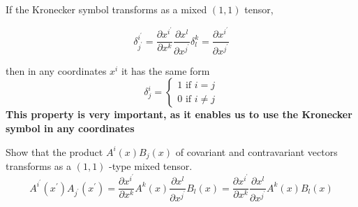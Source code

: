 If the Kronecker symbol transforms as a mixed $(1,1)$ tensor,
\begin{qt}
\begin{equation}
\delta_{j^{\prime}}^{i^{\prime}}=\frac{\partial x^{i^{\prime}}}{\partial x^{k}} \frac{\partial x^{l}}{\partial x^{j^{\prime}}} \delta_{l}^{k}=\frac{\partial x^{i^{\prime}}}{\partial x^{j^{\prime}}}
\end{equation}
\end{qt}
then in any coordinates $x^i$ it has the same form 
$$
\delta_{j}^{i}=\left\{\begin{array}{l}
{1 \text { if } i=j} \\
{0 \text { if } i \neq j}
\end{array}\right.
$$
\textbf{This property is very important, as it enables us to use the Kronecker symbol in any coordinates}

\begin{example}
Show that the product $A^{i}(x) B_{j}(x)$ of covariant and contravariant vectors transforms as a $(1,1)$ -type mixed tensor.
$$
A^{i^{\prime}}\left(x^{\prime}\right) A_{j^{\prime}}\left(x^{\prime}\right)=\frac{\partial x^{i^{\prime}}}{\partial x^{k}} A^{k}(x) \frac{\partial x^{l}}{\partial x^{j^{\prime}}} B_{l}(x)=\frac{\partial x^{i^{\prime}}}{\partial x^{k}} \frac{\partial x^{l}}{\partial x^{j^{\prime}}} A^{k}(x) B_{l}(x)
$$
\end{example}
